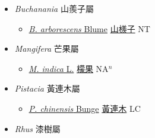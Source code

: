 
  \begin{itemize}
 \item[] \textit{Buchanania} 山羨子屬
                    
  \begin{itemize}
        \item[] \href{http://www.theplantlist.org/tpl1.1/search?q=Buchanania+arborescens}{\textit{B. arborescens} Blume}   \href{\detokenize{http://taibnet.sinica.edu.tw/chi/taibnet_species_list.php?T2=山檨子&T2_new_value=true&fr=y}}{山檨子} NT
  \end{itemize}
 \item[] \textit{Mangifera} 芒果屬
                    
  \begin{itemize}
        \item[] \href{http://www.theplantlist.org/tpl1.1/search?q=Mangifera+indica}{\textit{M. indica} L.}   \href{\detokenize{http://taibnet.sinica.edu.tw/chi/taibnet_species_list.php?T2=檬果&T2_new_value=true&fr=y}}{檬果} NA$^n$
  \end{itemize}
 \item[] \textit{Pistacia} 黃連木屬
                    
  \begin{itemize}
        \item[] \href{http://www.theplantlist.org/tpl1.1/search?q=Pistacia+chinensis}{\textit{P. chinensis} Bunge}   \href{\detokenize{http://taibnet.sinica.edu.tw/chi/taibnet_species_list.php?T2=黃連木&T2_new_value=true&fr=y}}{黃連木} LC
  \end{itemize}
 \item[] \textit{Rhus} 漆樹屬
                    

\end{itemize}
